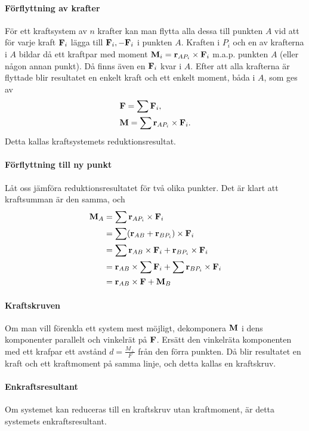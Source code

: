 \paragraph{Förflyttning av krafter}
För ett kraftsystem av $n$ krafter kan man flytta alla dessa till punkten $A$ vid att för varje kraft $\vect{F}_i$ lägga till $\vect{F}_i, -\vect{F}_i$ i punkten $A$. Kraften i $P_i$ och en av krafterna i $A$ bildar då ett kraftpar med moment $\vect{M}_i = \vect{r}_{AP_i}\times\vect{F}_i$ m.a.p. punkten $A$ (eller någon annan punkt). Då finns även en $\vect{F}_i$ kvar i $A$. Efter att alla krafterna är flyttade blir resultatet en enkelt kraft och ett enkelt moment, båda i $A$, som ges av
\begin{align*}
	&\vect{F} = \sum\vect{F}_i, \\
	&\vect{M} = \sum\vect{r}_{AP_i}\times\vect{F}_i.
\end{align*}
Detta kallas kraftsystemets reduktionsresultat.

\paragraph{Förflyttning till ny punkt}
Låt oss jämföra reduktionsresultatet för två olika punkter. Det är klart att kraftsumman är den samma, och
\begin{align*}
	\vect{M}_A &= \sum\vect{r}_{AP_i}\times\vect{F}_i \\
	           &= \sum(\vect{r}_{AB} + \vect{r}_{BP_i})\times\vect{F}_i \\
	           &= \sum\vect{r}_{AB}\times\vect{F}_i + \vect{r}_{BP_i}\times\vect{F}_i \\
	           &= \vect{r}_{AB}\times\sum\vect{F}_i + \sum\vect{r}_{BP_i}\times\vect{F}_i \\
	           &= \vect{r}_{AB}\times\vect{F} + \vect{M}_{B}
\end{align*}

\paragraph{Kraftskruven}
Om man vill förenkla ett system mest möjligt, dekomponera $\vect{M}$ i dens komponenter parallelt och vinkelrät på $\vect{F}$. Ersätt den vinkelräta komponenten med ett krafpar ett avstånd $d = \frac{M_\perp}{F}$ från den förra punkten. Då blir resultatet en kraft och ett kraftmoment på samma linje, och detta kallas en kraftskruv.

\paragraph{Enkraftsresultant}
Om systemet kan reduceras till en kraftskruv utan kraftmoment, är detta systemets enkraftsresultant.

